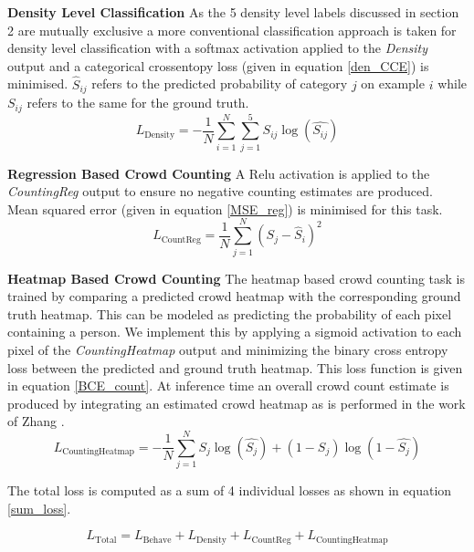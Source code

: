 \documentclass[10pt,twocolumn,letterpaper]{article}
\begin{document}
\textbf{Density Level Classification}
As the 5 density level labels discussed in section 2 are mutually exclusive a more conventional classification approach is taken for density level classification with a softmax activation applied to the \textit{Density} output and a categorical crossentopy loss (given in equation \ref{den_CCE}) is minimised. $\hat{S}_{ij}$ refers to the predicted probability of category $j$ on example $i$ while $S_{ij}$ refers to the same for the ground truth. 
%
\begin{equation}
L_{\text{Density}}=-\frac{1}{N}\sum_{i=1}^{N} \sum_{j=1}^5 S_{ij}\log(\hat{S_{ij}})
\label{den_CCE}
\end{equation}


\textbf{Regression Based Crowd Counting}
A Relu activation is applied to the \textit{CountingReg} output to ensure no negative counting estimates are produced. Mean squared error (given in equation \ref{MSE_reg}) is minimised for this task.
%
\begin{equation}
L_{\text{CountReg}}={\frac{1}{N}\sum_{j=1}^{N}( S_{j}-\hat{S}_{i}  )^{2} }
\label{MSE_reg}
\end{equation}


\textbf{Heatmap Based Crowd Counting}
The heatmap based crowd counting task is trained by comparing a predicted crowd heatmap with the corresponding ground truth heatmap. This can be modeled as predicting the probability of each pixel containing a person. We implement this by applying a sigmoid activation to each pixel of the \textit{CountingHeatmap} output and minimizing the binary cross entropy loss between the predicted and ground truth heatmap. This loss function is given in equation \ref{BCE_count}. At inference time an overall crowd count estimate is produced by integrating an estimated crowd heatmap as is performed in the work of Zhang \etal \cite{zhang2016single}.
%
\begin{equation}
L_{\text{CountingHeatmap}}=-\frac{1}{N}\sum_{j=1}^{N}S_{j}\log(\hat{S_{j}})+(1-S_{j})\log(1-\hat{S_{j}})
\label{BCE_count}
\end{equation}

The total loss is computed as a sum of 4 individual losses as shown in equation \ref{sum_loss}.

\begin{equation}
L_{\text{Total}}=L_{\text{Behave}}+L_{\text{Density}}+L_{\text{CountReg}}+L_{\text{CountingHeatmap}}
\label{sum_loss}
\end{equation}
\end{document}
